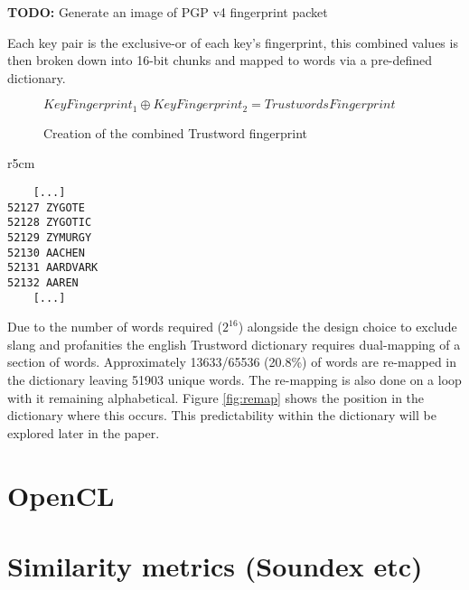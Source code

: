 \textbf{TODO: } Generate an image of PGP v4 fingerprint packet

Each key pair is the exclusive-or of each key's fingerprint, this combined values is then broken down into 16-bit chunks and mapped to words via a pre-defined dictionary.

\begin{figure}[h!]
    \centering
    $KeyFingerprint_{1} \oplus KeyFingerprint_{2} = TrustwordsFingerprint$
    \caption{Creation of the combined Trustword fingerprint}
\end{figure}

\begin{wrapfigure}{r}{5cm}
    \centering
    \begin{BVerbatim}
    [...]
52127 ZYGOTE
52128 ZYGOTIC
52129 ZYMURGY
52130 AACHEN
52131 AARDVARK
52132 AAREN
    [...]
    \end{BVerbatim}
    \caption{Re-mapping position in Trustword dictionary}
    \label{fig:remap}
\end{wrapfigure}

Due to the number of words required ($2^{16}$) alongside the design choice to exclude slang and profanities the english Trustword dictionary requires dual-mapping of a section of words. Approximately 13633/65536 (20.8\%) of words are re-mapped in the dictionary leaving 51903 unique words. The re-mapping is also done on a loop with it remaining alphabetical. Figure \ref{fig:remap} shows the position in the dictionary where this occurs. This predictability within the dictionary will be explored later in the paper.




\section{OpenCL}

\section{Similarity metrics (Soundex etc)}